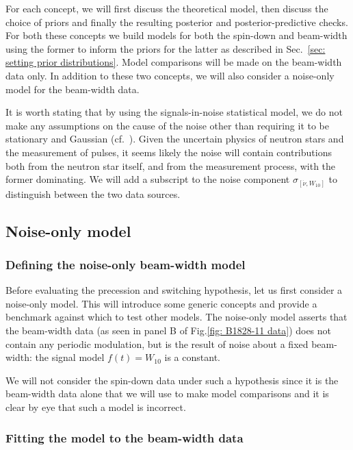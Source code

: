 \documentclass[../full_thesis/full_thesis.tex]{subfiles}
\begin{document}
For each concept, we will first discuss the theoretical model, then discuss the
choice of priors and finally the resulting posterior and posterior-predictive
checks. For both these concepts we build models for both the spin-down and
beam-width using the former to inform the priors for the latter as described in
Sec.~\ref{sec: setting prior distributions}. Model comparisons will be made on
the beam-width data only. In addition to these two concepts, we will also
consider a noise-only model for the beam-width data.

It is worth stating that by using the signals-in-noise statistical model, we do
not make any assumptions on the cause of the noise other than requiring it to
be stationary and Gaussian (cf.\ \citet{jaynes2003probability}). Given the
uncertain physics of neutron stars and the measurement of pulses, it seems
likely the noise will contain contributions both from the neutron star itself,
and from the measurement process, with the former dominating. We will add a
subscript to the noise component $\sigma_{[\dot{\nu}, W_{10}]}$ to distinguish
between the two data sources.

\subsection{Noise-only model}
\label{sec: noise-only}
\subsubsection{Defining the noise-only beam-width model}

Before evaluating the precession and switching hypothesis, let us first
consider a noise-only model.  This will introduce some generic concepts and
provide a benchmark against which to test other models. The noise-only model
asserts that the beam-width data (as seen in panel B of Fig.\ref{fig: B1828-11
data}) does not contain any periodic modulation, but is the result of noise
about a fixed beam-width: the signal model $f(t) = W_{10}$ is a constant.

We will not consider the spin-down data under such a hypothesis since it is the
beam-width data alone that we will use to make model comparisons and it is
clear by eye that such a model is incorrect.

\subsubsection{Fitting the model to the beam-width data}
\label{sec: noise-only fitting the model}
\end{document}

